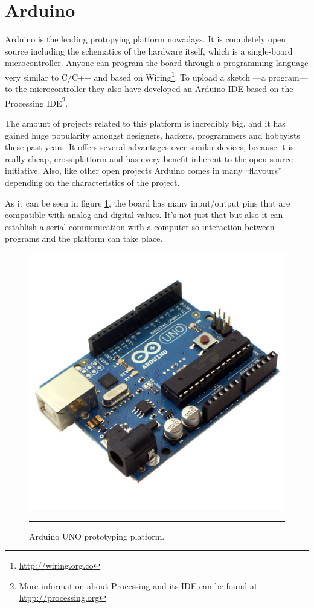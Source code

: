 \section{Arduino}

Arduino is the leading protopying platform nowadays. It is completely open source including the schematics of the hardware itself, which is a single-board microcontroller. Anyone can program the board through a programming language very similar to C/C++ and based on Wiring\footnote{\url{http://wiring.org.co}}. To upload a sketch ---a program--- to the microcontroller they also have developed an Arduino IDE based on the Processing IDE\footnote{More information about Processing and its IDE can be found at \url{htpp://processing.org}}.

The amount of projects related to this platform is incredibly big, and it has gained huge popularity amongst designers, hackers, programmers and hobbyists these past years. It offers several advantages over similar devices, because it is really cheap, cross-platform and has every benefit inherent to the open source initiative. Also, like other open projects Arduino comes in many ``flavours'' depending on the characteristics of the project.

As it can be seen in figure \ref{fig:ArduinoUNO}, the board has many input/output pins that are compatible with analog and digital values. It's not just that but also it can establish a serial communication with a computer so interaction between programs and the platform can take place.


\begin{figure}[htbp]
    \centering
    \includegraphics[scale=0.2]{./Figures/auno.jpg}
        \rule{35em}{0.5pt}
        \caption[Arduino UNO]{Arduino UNO prototyping platform.}
    \label{fig:ArduinoUNO}
\end{figure}

